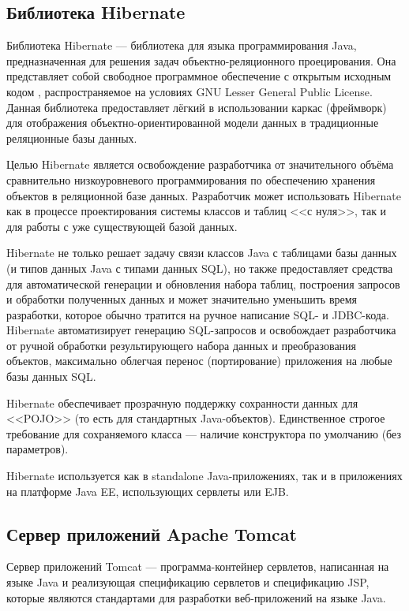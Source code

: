 \documentclass[14pt,a4paper]{reportmod}
\begin{document}
\subsection{Библиотека Hibernate}
Библиотека Hibernate --- библиотека для языка программирования Java, предназначенная для решения задач объектно-реляционного проецирования. Она представляет собой свободное программное обеспечение с открытым исходным кодом , распространяемое на условиях GNU Lesser General Public License. Данная библиотека предоставляет лёгкий в использовании каркас (фреймворк) для отображения объектно-ориентированной модели данных в традиционные реляционные базы данных.


Целью Hibernate является освобождение разработчика от значительного объёма сравнительно низкоуровневого программирования по обеспечению хранения объектов в реляционной базе данных. Разработчик может использовать Hibernate как в процессе проектирования системы классов и таблиц <<с нуля>>, так и для работы с уже существующей базой данных.


Hibernate не только решает задачу связи классов Java с таблицами базы данных (и типов данных Java с типами данных SQL), но также предоставляет средства для автоматической генерации и обновления набора таблиц, построения запросов и обработки полученных данных и может значительно уменьшить время разработки, которое обычно тратится на ручное написание SQL- и JDBC-кода. Hibernate автоматизирует генерацию SQL-запросов и освобождает разработчика от ручной обработки результирующего набора данных и преобразования объектов, максимально облегчая перенос (портирование) приложения на любые базы данных SQL.


Hibernate обеспечивает прозрачную поддержку сохранности данных  для <<POJO>> (то есть для стандартных Java-объектов). Единственное строгое требование для сохраняемого класса --- наличие конструктора по умолчанию (без параметров).


Hibernate используется как в standalone Java-приложениях, так и в приложениях на платформе Java EE, использующих сервлеты или EJB\cite{refhibernate}.
\subsection{Сервер приложений Apache Tomcat}
Сервер приложений Tomcat --- программа-контейнер сервлетов, написанная на языке Java и реализующая спецификацию сервлетов и спецификацию JSP, которые являются стандартами для разработки веб-приложений на языке Java.
\end{document}
